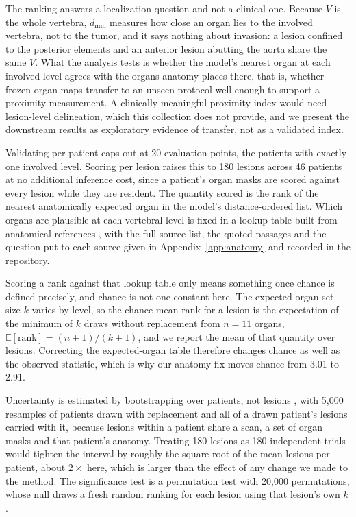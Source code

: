 \documentclass[10pt]{article}
\begin{document}
The ranking answers a localization question and not a clinical one. Because $V$ is
the whole vertebra, $d_{\text{mm}}$ measures how close an organ lies to the involved
vertebra, not to the tumor, and it says nothing about invasion: a lesion confined
to the posterior elements and an anterior lesion abutting the aorta share the same
$V$. What the analysis tests is whether the model's nearest organ at each involved
level agrees with the organs anatomy places there, that is, whether frozen organ
maps transfer to an unseen protocol well enough to support a proximity
measurement. A clinically meaningful proximity index would need lesion-level
delineation, which this collection does not provide, and we present the
downstream results as exploratory evidence of transfer, not as a validated index.

Validating per patient caps out at 20 evaluation points, the patients with exactly
one involved level. Scoring per lesion raises this to 180 lesions across 46
patients at no additional inference cost, since a patient's organ masks are scored
against every lesion while they are resident. The quantity scored is the rank of
the nearest anatomically expected organ in the model's distance-ordered list.
Which organs are plausible at each vertebral level is fixed in a lookup table
built from anatomical references \cite{oh2009retrodiaphragmatic}, with the full
source list, the quoted passages and the question put to each source given in
Appendix~\ref{app:anatomy} and recorded in the repository.

Scoring a rank against that lookup table only means something once chance is
defined precisely, and chance is not one constant here. The expected-organ set size $k$ varies by level,
so the chance mean rank for a lesion is the expectation of the minimum of $k$ draws
without replacement from $n=11$ organs, $\mathbb{E}[\text{rank}] = (n+1)/(k+1)$,
and we report the mean of that quantity over lesions. Correcting the
expected-organ table therefore changes chance as well as the observed statistic,
which is why our anatomy fix moves chance from 3.01 to 2.91.

Uncertainty is estimated by bootstrapping over patients, not lesions
\cite{efron1994bootstrap}, with 5{,}000 resamples of patients drawn with
replacement and all of a drawn patient's lesions carried with it, because lesions
within a patient share a scan, a set of organ masks and that patient's anatomy.
Treating 180 lesions as 180 independent trials would tighten the interval by
roughly the square root of the mean lesions per patient, about $2\times$ here,
which is larger than the effect of any change we made to the method. The
significance test is a permutation test with 20{,}000 permutations, whose null
draws a fresh random ranking for each lesion using that lesion's own $k$.
\end{document}
